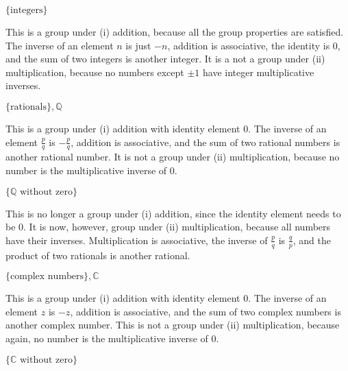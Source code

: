 \documentclass[../key.tex]{subfiles}
\begin{document}
\begin{inner_problem}
\item $\{\text{integers}\}$
\end{inner_problem}

This is a group under (i) addition, because all the group properties are satisfied. The inverse of an element $n$ is just $-n$, addition is associative, the identity is $0$, and the sum of two integers is another integer. It is a not a group under (ii) multiplication, because no numbers except $\pm 1$ have integer multiplicative inverses.

\begin{inner_problem}
\item $\{\text{rationals}\}, \mathbb{Q}$
\end{inner_problem}

This is a group under (i) addition with identity element $0$. The inverse of an element $\frac{p}{q}$ is $-\frac{p}{q}$, addition is associative, and the sum of two rational numbers is another rational number. It is not a group under (ii) multiplication, because no number is the multiplicative inverse of $0$.

\begin{inner_problem}
\item $\{\mathbb{Q}\text{ without zero}\}$
\end{inner_problem}

This is no longer a group under (i) addition, since the identity element needs to be $0$. It is now, however, group under (ii) multiplication, because all numbers have their inverses. Multiplication is associative, the inverse of $\frac{p}{q}$ is $\frac{q}{p}$, and the product of two rationals is another rational.

\begin{inner_problem}
\item $\{\text{complex numbers}\}, \mathbb{C}$
\end{inner_problem}

This is a group under (i) addition with identity element $0$. The inverse of an element $z$ is $-z$, addition is associative, and the sum of two complex numbers is another complex number. This is not a group under (ii) multiplication, because again, no number is the multiplicative inverse of $0$.

\begin{inner_problem}
\item $\{\mathbb{C}\text{ without zero}\}$
\end{inner_problem}
\end{document}
